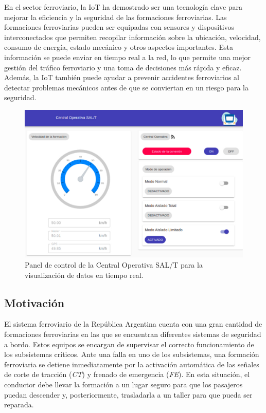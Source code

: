 En el sector ferroviario, la IoT ha demostrado ser una tecnología clave para mejorar la eficiencia y la seguridad de las formaciones ferroviarias. Las formaciones ferroviarias pueden ser equipadas con sensores y dispositivos interconectados que permiten recopilar información sobre la ubicación, velocidad, consumo de energía, estado mecánico y otros aspectos importantes. Esta información se puede enviar en tiempo real a la red, lo que permite una mejor gestión del tráfico ferroviario y una toma de decisiones más rápida y eficaz. Además, la IoT también puede ayudar a prevenir accidentes ferroviarios al detectar problemas mecánicos antes de que se conviertan en un riesgo para la seguridad.


\vspace{1cm}

\begin{figure}[!ht]
	\centering
	\includegraphics[width=.75\textwidth]{./Figures/dashboard.jpeg}
	\caption{Panel de control de la Central Operativa SAL/T para la visualización de datos en tiempo real.}
	\label{fig:dashboard}
\end{figure}


\subsection{Motivación}

El sistema ferroviario de la República Argentina cuenta con una gran cantidad de formaciones ferroviarias en las que se encuentran diferentes sistemas de seguridad a bordo. Estos equipos se encargan de supervisar el correcto funcionamiento de los subsistemas críticos. Ante una falla en uno de los subsistemas, una formación ferroviaria se detiene inmediatamente por la activación automática de las señales de corte de tracción (\textit{CT}) y frenado de emergencia (\textit{FE}). En esta situación, el conductor debe llevar la formación a un lugar seguro para que los pasajeros puedan descender y, posteriormente, trasladarla a un taller para que pueda ser reparada.

